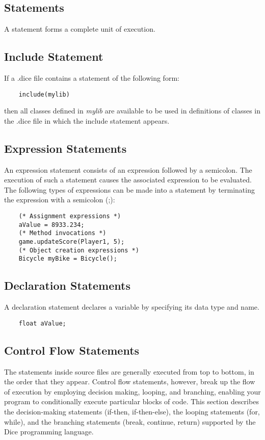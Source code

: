 \begin{homeworkProblem}
	\chapter{Statements}
	A statement forms a complete unit of execution. 
	
	\section{Include Statement}
	If a .dice file contains a statement of the following form:
	\begin{verbatim}
	include(mylib)
	\end{verbatim}
	then all classes defined in \textit{mylib} are available to be used in definitions of classes in 
	the .dice file in which the include statement appears.	

	\section{Expression Statements}
	An expression statement consists of an expression followed by a semicolon. The execution of such a statement causes the associated expression to be evaluated. The following types of expressions can be made into a statement by terminating the expression with a semicolon (;):
	\begin{verbatim}
	(* Assignment expressions *)
	aValue = 8933.234;
	(* Method invocations *)
	game.updateScore(Player1, 5);
	(* Object creation expressions *)
	Bicycle myBike = Bicycle();
	\end{verbatim}
	
	\section{Declaration Statements}
	A declaration statement declares a variable by specifying its data type and name.
	\begin{verbatim}
	float aValue;
	\end{verbatim}
	
	\section{Control Flow Statements}
	The statements inside source files are generally executed from top to bottom, in the order that they appear. Control flow statements, however, break up the flow of execution by employing decision making, looping, and branching, enabling your program to conditionally execute particular blocks of code. This section describes the decision-making statements (if-then, if-then-else), the looping statements (for, while), and the branching statements (break, continue, return) supported by the Dice programming language.


\end{homeworkProblem}

